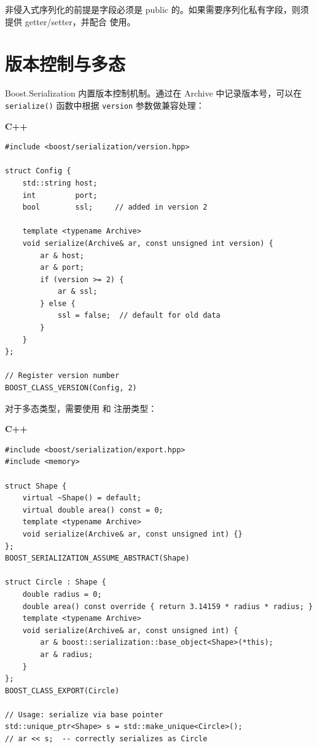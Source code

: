 \documentclass[12pt,a4paper,fontset=fandol]{ctexbook}
\newcommand{\Fn}[1]{\texttt{#1()}}
\newcommand{\Tp}[1]{\texttt{#1}}
\newcommand{\cpplabel}{%
  \noindent\begin{tcolorbox}[colback=algheadbg,coltext=white,
    sharp corners,boxrule=0pt,width=3.0em,height=1.4em,
    halign=center,valign=center,nobeforeafter,left=0pt,right=0pt,
    top=0pt,bottom=0pt]\small\bfseries C++\end{tcolorbox}}
\begin{document}
非侵入式序列化的前提是字段必须是 public 的。如果需要序列化私有字段，则须提供 getter/setter，并配合  使用。

\section{版本控制与多态}\label{sec:boost-version}

Boost.Serialization 内置版本控制机制。通过在 Archive 中记录版本号，可以在 \Fn{serialize} 函数中根据 \Tp{version} 参数做兼容处理：

\cpplabel
\begin{lstlisting}[caption={Boost.Serialization: 版本控制}]
#include <boost/serialization/version.hpp>

struct Config {
    std::string host;
    int         port;
    bool        ssl;     // added in version 2

    template <typename Archive>
    void serialize(Archive& ar, const unsigned int version) {
        ar & host;
        ar & port;
        if (version >= 2) {
            ar & ssl;
        } else {
            ssl = false;  // default for old data
        }
    }
};

// Register version number
BOOST_CLASS_VERSION(Config, 2)
\end{lstlisting}

对于多态类型，需要使用  和  注册类型：

\cpplabel
\begin{lstlisting}[caption={Boost.Serialization: 多态类型序列化}]
#include <boost/serialization/export.hpp>
#include <memory>

struct Shape {
    virtual ~Shape() = default;
    virtual double area() const = 0;
    template <typename Archive>
    void serialize(Archive& ar, const unsigned int) {}
};
BOOST_SERIALIZATION_ASSUME_ABSTRACT(Shape)

struct Circle : Shape {
    double radius = 0;
    double area() const override { return 3.14159 * radius * radius; }
    template <typename Archive>
    void serialize(Archive& ar, const unsigned int) {
        ar & boost::serialization::base_object<Shape>(*this);
        ar & radius;
    }
};
BOOST_CLASS_EXPORT(Circle)

// Usage: serialize via base pointer
std::unique_ptr<Shape> s = std::make_unique<Circle>();
// ar << s;  -- correctly serializes as Circle
\end{lstlisting}
\end{document}
